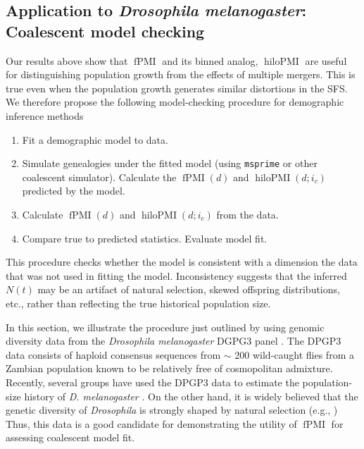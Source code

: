 \documentclass[11pt, letterpaper]{article}   	%
\DeclareMathOperator{\fpmi}{fPMI}
\DeclareMathOperator{\hilopmi}{hiloPMI}
\begin{document}
\subsection*{Application to \textit{Drosophila melanogaster}: Coalescent model checking}

Our results above show that $\fpmi$ and its binned analog, $\hilopmi$ are useful for distinguishing population growth from the effects of multiple mergers.
This is true even when the population growth generates similar distortions in the SFS.
We therefore propose the following model-checking procedure for demographic inference methods
\begin{enumerate}[label=(\roman*), before=\unskip{: }]
    \item Fit a demographic model to data.
    \item Simulate genealogies under the fitted model (using \texttt{msprime} or other coalescent simulator). Calculate the $\fpmi(d)$ and $\hilopmi(d;i_c)$ predicted by the model.
    \item Calculate $\fpmi(d)$ and $\hilopmi(d;i_c)$ from the data.
    \item Compare true to predicted statistics. Evaluate model fit.
\end{enumerate}
This procedure checks whether the model is consistent with a dimension the data that was not used in fitting the model.
Inconsistency suggests that the inferred $N(t)$ may be an artifact of natural selection, skewed offspring distributions, etc., rather than reflecting the true historical population size.

In this section, we illustrate the procedure just outlined by using genomic diversity data from the \textit{Drosophila melanogaster} DGPG3 panel \cite{LackEtAl2015}.
The DPGP3 data consists of haploid consensus sequences from $\sim$ 200 wild-caught flies from a Zambian population known to be relatively free of cosmopolitan admixture.
Recently, several groups have used the DPGP3 data to estimate the population-size history of \textit{D. melanogaster} \autocite{TerhorstEtAl2017,RagsdaleGutenkunst2017}.
On the other hand, it is widely believed that the genetic diversity of \textit{Drosophila} is strongly shaped by natural selection (e.g., \cite{Elyashiv??201?, GarudPetrov2016, others?})
Thus, this data is a good candidate for demonstrating the utility of $\fpmi$ for assessing coalescent model fit.
\end{document}
